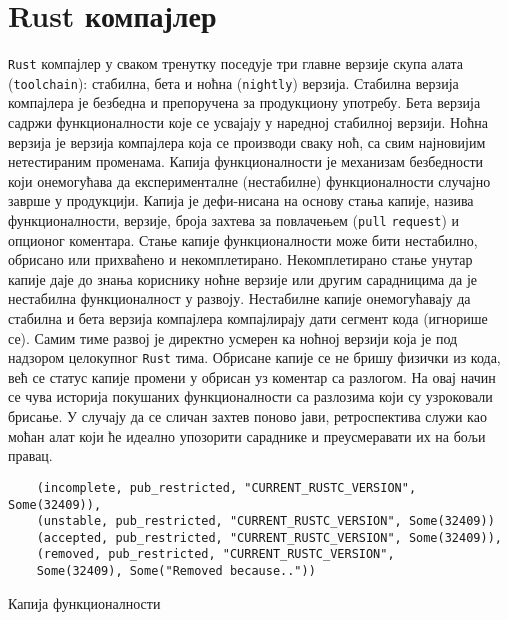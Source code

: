 \section{Rust компајлер}

\verb|Rust| компајлер у сваком тренутку поседује три главне верзије скупа алата (\verb|toolchain|): стабилна, бета и ноћна (\verb|nightly|) верзија.
Стабилна верзија компајлера је безбедна и препоручена за продукциону употребу. Бета верзија садржи функционалности
које се усвајају у наредној стабилној верзији. Ноћна верзија је верзија компајлера која се 
производи сваку ноћ, са свим најновијим нетестираним променама. Капија функционалности је механизам безбедности
који онемогућава да експерименталне (нестабилне) функционалности случајно заврше у продукцији. 
Капија је дефи\hyp{}нисана на основу стања капије, назива функционалности, верзије, броја захтева за повлачењем
(\verb|pull| \verb|request|) и опционог коментара.
Стање капије функционалности може бити нестабилно, обрисано или прихваћено и некомплетирано. Некомплетирано 
стање унутар капије даје до знања кориснику ноћне верзије или другим сарадницима да је нестабилна функционалност 
у развоју.  Нестабилне капије онемогућавају да стабилна и бета верзија компајлера компајлирају 
дати сегмент кода (игнорише се).  Самим тиме развој је директно 
усмерен ка ноћној верзији која је под надзором целокупног \verb|Rust| тима. Обрисане капије се не бришу физички из кода,
већ се статус капије промени у обрисан уз коментар са разлогом. На овај начин се чува историја покушаних 
функционалности са разлозима који су узроковали брисање. У случају да се сличан захтев поново јави, ретроспектива
служи као моћан алат који ће идеално упозорити сараднике и преусмеравати их на бољи правац.

\begin{listing}[H]
\begin{verbatim}
    (incomplete, pub_restricted, "CURRENT_RUSTC_VERSION", Some(32409)),
    (unstable, pub_restricted, "CURRENT_RUSTC_VERSION", Some(32409))
    (accepted, pub_restricted, "CURRENT_RUSTC_VERSION", Some(32409)),
    (removed, pub_restricted, "CURRENT_RUSTC_VERSION", 
    Some(32409), Some("Removed because.."))
\end{verbatim}
\caption{Капија функционалности}
\label{lst:rustup_gate}
\end{listing}


